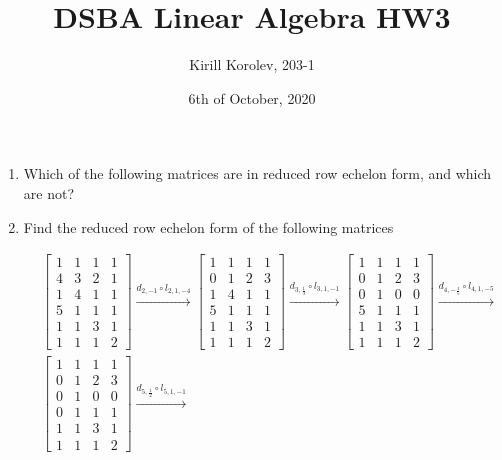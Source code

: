 \documentclass{article}
\title{DSBA Linear Algebra HW3}
\author{Kirill Korolev, 203-1}
\date{6th of October, 2020}
\begin{document}
	
	\maketitle
	
	\begin{enumerate}
		
		\item Which of the following matrices are in reduced row echelon form, and which are not?
		
		\item Find the reduced row echelon form of the following matrices
		
		\begin{align*}
		&\begin{bmatrix}
		1 & 1 & 1 & 1\\
		4 & 3 & 2 & 1\\
		1 & 4 & 1 & 1\\
		5 & 1 & 1 & 1\\
		1 & 1 & 3 & 1\\
		1 & 1 & 1 & 2
		\end{bmatrix} 
		\stackrel{d_{2, -1} \circ l_{2,1,-4}}{\to}
		\begin{bmatrix}
		1 & 1 & 1 & 1\\
		0 & 1 & 2 & 3\\
		1 & 4 & 1 & 1\\
		5 & 1 & 1 & 1\\
		1 & 1 & 3 & 1\\
		1 & 1 & 1 & 2
		\end{bmatrix}
		\stackrel{d_{3, \frac{1}{3}} \circ l_{3,1,-1}}{\to}
		\begin{bmatrix}
		1 & 1 & 1 & 1\\
		0 & 1 & 2 & 3\\
		0 & 1 & 0 & 0\\
		5 & 1 & 1 & 1\\
		1 & 1 & 3 & 1\\
		1 & 1 & 1 & 2
		\end{bmatrix}
		\stackrel{d_{4, -\frac{1}{5}} \circ l_{4,1,-5}}{\to}\\
		&\begin{bmatrix}
		1 & 1 & 1 & 1\\
		0 & 1 & 2 & 3\\
		0 & 1 & 0 & 0\\
		0 & 1 & 1 & 1\\
		1 & 1 & 3 & 1\\
		1 & 1 & 1 & 2
		\end{bmatrix}
		\stackrel{d_{5, \frac{1}{2}} \circ l_{5,1,-1}}{\to}

\end{align*}
\end{enumerate}
\end{document}
